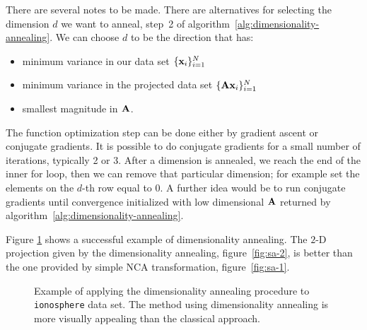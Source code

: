   There are several notes to be made. There are alternatives for selecting the dimension $d$ we want to anneal, step~2 of algorithm~\ref{alg:dimensionality-annealing}. We can choose $d$ to be the direction that has:
    \begin{itemize}
     \item minimum variance in our data set $\{\mathbf{x}_i\}_{i=1}^N$
     \item minimum variance in the projected data set $\{\mathbf{A}\mathbf{x}_i\}_{i=1}^N$
     \item smallest magnitude in $\mathbf{A}$.
    \end{itemize}

    The function optimization step can be done either by gradient ascent or conjugate gradients. It is possible to do conjugate gradients for a small number of iterations, typically 2 or 3. After a dimension is annealed, we reach the end of the inner for loop, then we can remove that particular dimension; for example set the elements on the $d$-th row equal to 0. A further idea would be to run conjugate gradients until convergence initialized with low dimensional $\mathbf{A}$ returned by algorithm~\ref{alg:dimensionality-annealing}.

    Figure \ref{fig:dimensionality-annealing} shows a successful example of dimensionality annealing. The $2$-D projection given by the dimensionality annealing, figure~\ref{fig:sa-2}, is better than the one provided by simple NCA transformation, figure~\ref{fig:sa-1}. 

\begin{figure}
		 \centering
			    \hspace{0.02\textwidth}
		\caption[Dimensionality annealing example]{Example of applying the dimensionality annealing procedure to \texttt{ionosphere} data set. The method using dimensionality annealing is more visually appealing than the classical approach.}
		\label{fig:dimensionality-annealing}
	\end{figure}
	
